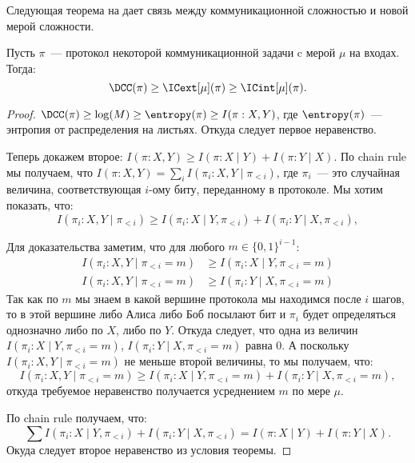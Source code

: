 Следующая теорема на дает связь между коммуникационной сложностью и новой мерой сложности.

\begin{theorem}
    Пусть $\pi$~--- протокол некоторой коммуникационной задачи c мерой $\mu$ на входах. Тогда:
    $$
        \DCC(\pi) \ge \ICext[\mu](\pi) \ge \ICint[\mu](\pi).
    $$ 
\end{theorem}

\begin{proof}
    $\DCC(\pi) \ge \log(M) \ge \entropy(\pi) \ge I(\pi : X, Y)$, где $\entropy(\pi)$~--- энтропия от
    распределения на листьях. Откуда следует первое неравенство.
    
    Теперь докажем второе: $I(\pi : X, Y) \ge I(\pi : X \mid Y) + I(\pi : Y \mid X)$. По chain rule мы
    получаем, что $I(\pi : X, Y) = \sum\limits_i I(\pi_i : X, Y \mid \pi_{< i})$, где $\pi_i$~--- это
    случайная величина, соответствующая $i$-ому биту, переданному в протоколе. Мы хотим показать, что:
    $$
        I(\pi_i : X, Y \mid \pi_{< i}) \ge I(\pi_i : X \mid Y, \pi_{< i}) +
        I(\pi_i : Y \mid X, \pi_{< i}),
    $$

    Для доказательства заметим, что для любого $m \in \{0, 1\}^{i - 1}$:
    \begin{align*}
      I(\pi_i : X, Y \mid \pi_{< i} = m) &\ge I(\pi_i : X \mid Y, \pi_{< i} = m) \\
      I(\pi_i : X, Y \mid \pi_{< i} = m) &\ge I(\pi_i : Y \mid X, \pi_{< i} = m)
    \end{align*}
    Так как по $m$ мы знаем в какой вершине протокола мы находимся после $i$ шагов, то в этой
    вершине либо Алиса либо Боб посылают бит и $\pi_i$ будет определяться однозначно либо по $X$, либо по
    $Y$. Откуда следует, что одна из величин $I(\pi_i : X \mid Y, \pi_{< i} = m)$, $I(\pi_i : Y \mid X,
    \pi_{< i} = m)$ равна $0$. А поскольку $I(\pi_i : X, Y \mid \pi_{< i} = m)$ не меньше второй величины, то мы
    получаем, что:
    $$
        I(\pi_i : X, Y \mid \pi_{< i} = m) \ge I(\pi_i : X \mid Y, \pi_{< i} = m) +
        I(\pi_i : Y \mid X, \pi_{< i} = m),
    $$
    откуда требуемое неравенство получается усреднением $m$ по мере $\mu$.

    По chain rule получаем, что:
    $$
        \sum I(\pi_i : X \mid Y, \pi_{< i}) + I(\pi_i : Y \mid X, \pi_{< i}) =
        I(\pi : X \mid Y) + I(\pi : Y \mid X).
    $$ 
    Окуда следует второе неравенство из условия теоремы.
\end{proof}

